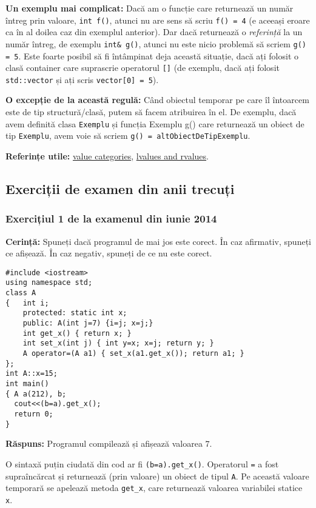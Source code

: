 \textbf{Un exemplu mai complicat:} Dacă am o funcție care returnează un număr întreg prin valoare, \texttt{int f()}, atunci nu are sens să scriu \texttt{f() = 4} (e aceeași eroare ca în al doilea caz din exemplul anterior). Dar dacă returnează o \emph{referință} la un număr întreg, de exemplu \texttt{int\& g()}, atunci nu este nicio problemă să scriem \texttt{g() = 5}. Este foarte posibil să fi întâmpinat deja această situație, dacă ați folosit o clasă container care suprascrie operatorul \texttt{[]} (de exemplu, dacă ați folosit \texttt{std::vector} și ați scris \texttt{vector[0] = 5}).

\textbf{O excepție de la această regulă:} Când obiectul temporar pe care îl întoarcem este de tip structură/clasă, putem să facem atribuirea în el. De exemplu, dacă avem definită clasa \texttt{Exemplu} și funcția {Exemplu g()} care returnează un obiect de tip \texttt{Exemplu}, avem voie să scriem \texttt{g() = altObiectDeTipExemplu}.

\textbf{Referințe utile:} \href{https://en.cppreference.com/w/cpp/language/value_category}{value categories}, \href{https://learn.microsoft.com/en-us/cpp/cpp/lvalues-and-rvalues-visual-cpp?view=msvc-170}{lvalues and rvalues}.

\subsection*{Exerciții de examen din anii trecuți}

\subsubsection*{Exercițiul 1 de la examenul din iunie 2014}

\textbf{Cerință:} Spuneți dacă programul de mai jos este corect. În caz afirmativ, spuneți ce afișează. În caz negativ, spuneți de ce nu este corect.
\begin{lstlisting}
#include <iostream>
using namespace std;
class A
{   int i;
    protected: static int x;
    public: A(int j=7) {i=j; x=j;}
    int get_x() { return x; }
    int set_x(int j) { int y=x; x=j; return y; }
    A operator=(A a1) { set_x(a1.get_x()); return a1; }
};
int A::x=15;
int main()
{ A a(212), b;
  cout<<(b=a).get_x();
  return 0;
}
\end{lstlisting}

\textbf{Răspuns:} Programul compilează și afișează valoarea \(7\).

O sintaxă puțin ciudată din cod ar fi \texttt{(b=a).get\_x()}. Operatorul \texttt{=} a fost supraîncărcat și returnează (prin valoare) un obiect de tipul \texttt{A}. Pe această valoare temporară se apelează metoda \texttt{get\_x}, care returnează valoarea variabilei statice \texttt{x}.

